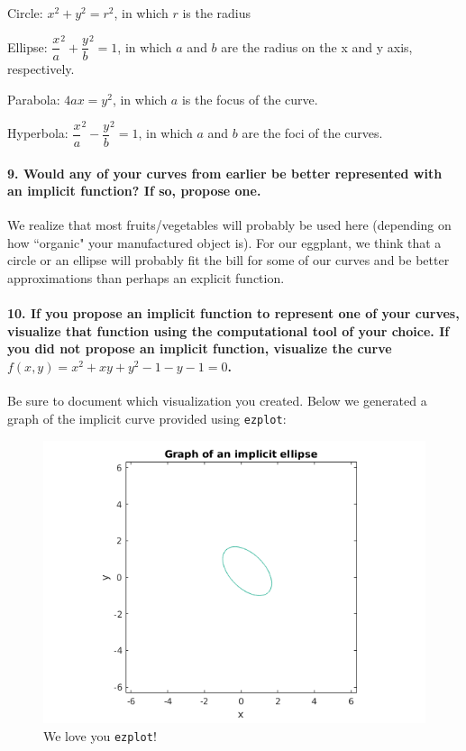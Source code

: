 \documentclass{article}
\begin{document}
Circle: $x^2 + y^2 = r^2$, in which $r$ is the radius

Ellipse: $\dfrac{x}{a}^2 + \dfrac{y}{b}^2 = 1$, in which $a$ and $b$ are the radius on the x and y axis, respectively. 

Parabola: $4ax = y^2$, in which $a$ is the focus of the curve. 

Hyperbola: $\dfrac{x}{a}^2 - \dfrac{y}{b}^2 = 1$, in which $a$ and $b$ are the foci of the curves.


\paragraph{9. Would any of your curves from earlier be better represented with an implicit function? If so, propose one.} 

We realize that most fruits/vegetables will probably be used here (depending on how ``organic" your manufactured object is). For our eggplant, we think that a circle or an ellipse will probably fit the bill for some of our curves and be better approximations than perhaps an explicit function.

\paragraph{10. If you propose an implicit function to represent one of your curves, visualize that function using the computational tool of your choice. If you did not propose an implicit function, visualize the curve $f(x,y) = x^2 + xy + y^2 - 1 - y - 1 = 0$.} 

Be sure to document which visualization you created. Below we generated a graph of the implicit curve provided using \texttt{ezplot}:



\begin{figure} [h!]
    \centering
    \includegraphics[width=1\columnwidth]{figs_and_code/ellipse.png}
    \caption{We love you \texttt{ezplot}!}
\end{figure}
\end{document}
